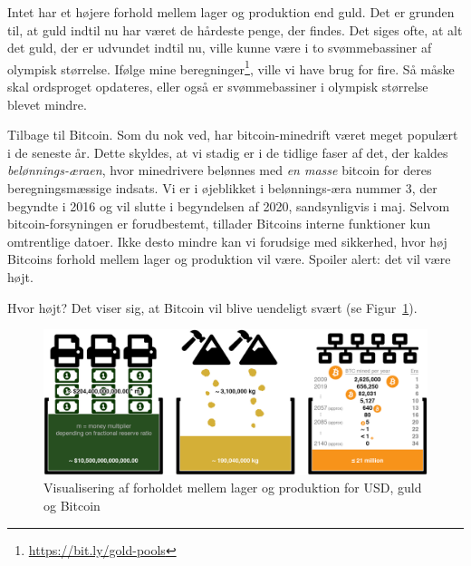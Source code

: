 \documentclass[paper=6in:9in,pagesize=pdftex,headinclude=on,footinclude=on,12pt]{scrbook}
\begin{document}
Intet har et højere forhold mellem lager og produktion end guld. Det er grunden til, at guld indtil nu har været de hårdeste penge, der findes. Det siges ofte, at alt det guld, der er udvundet indtil nu, ville kunne være i to svømmebassiner af olympisk størrelse. Ifølge mine beregninger\footnote{\url{https://bit.ly/gold-pools}}, ville vi have brug for fire. Så måske skal ordsproget opdateres, eller også er svømmebassiner i olympisk størrelse blevet mindre.

Tilbage til Bitcoin. Som du nok ved, har bitcoin-minedrift været meget populært i de seneste år. Dette skyldes, at vi stadig er i de tidlige faser af det, der kaldes \textit{belønnings-æraen}, hvor minedrivere belønnes med \textit{en masse} bitcoin for deres beregningsmæssige indsats. Vi er i øjeblikket i belønnings-æra nummer 3, der begyndte i 2016 og vil slutte i begyndelsen af 2020, sandsynligvis i maj. Selvom bitcoin-forsyningen er forudbestemt, tillader Bitcoins interne funktioner kun omtrentlige datoer. Ikke desto mindre kan vi forudsige med sikkerhed, hvor høj Bitcoins forhold mellem lager og produktion vil være. Spoiler alert: det vil være højt.

Hvor højt? Det viser sig, at Bitcoin vil blive uendeligt svært (se Figur~\ref{fig:stock-to-flow-white-cropped}).

\begin{figure}
  \includegraphics{assets/images/stock-to-flow-white-cropped.png}
  \caption{Visualisering af forholdet mellem lager og produktion for USD, guld og Bitcoin}
  \label{fig:stock-to-flow-white-cropped}
\end{figure}
\end{document}
